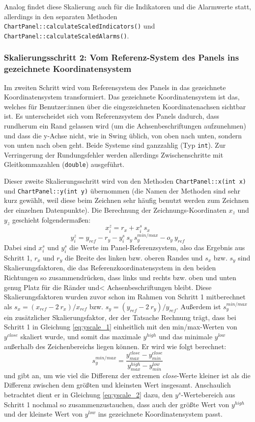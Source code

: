 \documentclass[fontsize=12pt, paper=a4, pagesize=auto, twoside=false, DIV=11, draft=false]{scrartcl}
\begin{document}
Analog findet diese Skalierung auch für die Indikatoren und die Alarmwerte statt, allerdings in den separaten Methoden \texttt{ChartPanel::cal\-cu\-late\-Scaled\-Indicators()} und \texttt{ChartPanel::calculate\-Scaled\-Alarms()}. 

\subsubsection{Skalierungsschritt 2: Vom Referenz-System des Panels ins gezeichnete Koordinatensystem}
Im zweiten Schritt wird vom Referensystem des Panels in das gezeichnete Koordinatensystem transformiert. Das gezeichnete Koordinatensystem ist das, welches für Benutzer:innen über die eingezeichneten Koordinatenachsen sichtbar ist. Es unterscheidet sich vom Referenzsystem des Panels dadurch, dass rundherum ein Rand gelassen wird (um die Achsenbeschriftungen aufzunehmen) und dass die y-Achse nicht, wie in Swing üblich, von oben nach unten, sondern von unten nach oben geht. Beide Systeme sind ganzzahlig (Typ \texttt{int}). Zur Verringerung der Rundungsfehler werden allerdings Zwischenschritte mit Gleitkommazahlen (\texttt{double}) ausgeführt. 

Dieser zweite Skalierungsschritt wird von den Methoden \texttt{ChartPanel::x(int x)} und \texttt{ChartPanel::y(int y)} übernommen (die Namen der Methoden sind sehr kurz gewählt, weil diese beim Zeichnen sehr häufig benutzt werden zum Zeichnen der einzelnen Datenpunkte). Die Berechnung der Zeichnungs-Koordinaten $x_z$ und $y_z$ geschieht folgendermaßen:
\begin{equation} \label{eq:xscale_2}
x^z_i = r_x + x^s_i ~s_x
\end{equation}
\begin{equation} \label{eq:yscale_2}
y^z_i =  y_{ref} - r_y - y^s_i ~s_y ~s_y^{min/max} - o_y ~y_{ref}
\end{equation}
Dabei sind $x^s_i$ und $y^s_i$ die Werte im Panel-Referenzsystem, also das Ergebnis aus Schritt 1, $r_x$ und $r_y$ die Breite des linken bzw. oberen Randes und $s_x$ bzw. $s_y$ sind Skalierungsfaktoren, die das Referenzkoordinatensystem in den beiden Richtungen so \glqq zusammendrücken\grqq, dass links und rechts bzw. oben und unten genug Platz für die Ränder und< Achsenbeschriftungen bleibt. Diese Skalierungsfaktoren wurden zuvor schon im Rahmen von Schritt 1 mitberechnet als $s_x = (x_{ref} - 2 ~r_x) / x_{ref}$ bzw. $s_y = (y_{ref} - 2 ~r_y) / y_{ref}$.
Außerdem ist $s_y^{min/max}$ ein zusätzlicher Skalierungsfaktor, der der Tatsache Rechnung trägt, dass bei Schritt 1 in Gleichung \eqref{eq:yscale_1} einheitlich mit den min/max-Werten von $y^{close}$ skaliert wurde, und somit das maximale $y^{high}$ und das minimale $y^{low}$ außerhalb des Zeichenbereichs liegen können. Er wird wie folgt berechnet:
$$ s_y^{min/max} = \frac{y^{close}_{max} - y^{close}_{min}}{y^{high}_{max} - y^{low}_{min}} $$
und gibt an, um wie viel die Differenz der extremen \textit{close}-Werte kleiner ist als die Differenz zwischen dem größten und kleinsten Wert insgesamt. Anschaulich betrachtet dient er in Gleichung \eqref{eq:yscale_2} dazu, den $y^s$-Wertebereich aus Schritt 1 nochmal so zusammenzustauchen, dass auch der größte Wert von $y^{high}$ und der kleinste Wert von $y^{low}$ ins gezeichnete Koordinatensystem passt. 
\end{document}
